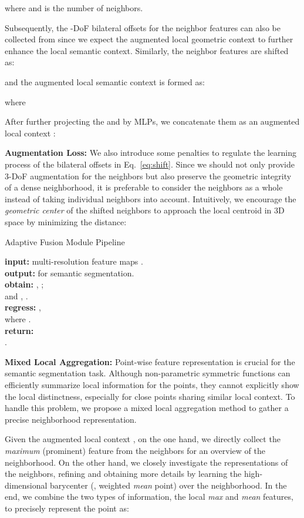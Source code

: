 \documentclass[10pt,twocolumn,letterpaper]{article}
\begin{document}
where  and  is the number of neighbors.

Subsequently, the -DoF bilateral offsets for the neighbor features  can also be collected from  since we expect the augmented local geometric context to further enhance the local semantic context. Similarly, the neighbor features are shifted as:

and the augmented local semantic context is formed as: 

where  

After further projecting the  and  by MLPs, we concatenate them as an augmented local context :


\noindent \textbf{Augmentation Loss:} 
We also introduce some penalties to regulate the learning process of the bilateral offsets in Eq.~\ref{eq:shift}. Since we should not only provide 3-DoF augmentation for the neighbors but also preserve the geometric integrity of a dense neighborhood, it is preferable to consider the neighbors as a whole instead of taking individual neighbors into account. Intuitively, we encourage the \emph{geometric center} of the shifted neighbors to approach the local centroid in 3D space by minimizing the  distance:


\begin{algorithm}\caption{Adaptive Fusion Module Pipeline}\label{alg:fusion}
\nonl\textbf{input:}  multi-resolution feature maps .\\
\nonl\textbf{output:}  for semantic segmentation.\\
\textbf{obtain:} , ;\\ 
\nonl and , .\\
\textbf{regress:} ,\\
\nonl where .\\
\textbf{return:}\\
\nonl .\\
\end{algorithm}

\noindent \textbf{Mixed Local Aggregation:} Point-wise feature representation is crucial for the semantic segmentation task. Although non-parametric symmetric functions can efficiently summarize local information for the points, they cannot explicitly show the local distinctness, especially for close points sharing similar local context. To handle this problem, we propose a mixed local aggregation method to gather a precise neighborhood representation. 

Given the augmented local context , on the one hand, we directly collect the \emph{maximum} (prominent) feature from the  neighbors for an overview of the neighborhood. On the other hand, we closely investigate the representations of the neighbors, refining and obtaining more details by learning the high-dimensional barycenter (\ie, weighted \emph{mean} point) over the neighborhood. In the end, we combine the two types of information, the local \emph{max} and \emph{mean} features, to precisely represent the point as:
\end{document}
